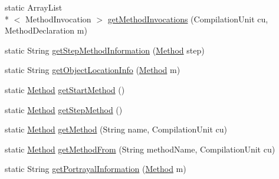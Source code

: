 \begin{DoxyCompactItemize}
\item 
static Array\-List\\*
$<$ Method\-Invocation $>$ \hyperlink{classit_1_1isislab_1_1masonassisteddocumentation_1_1mason_1_1analizer_1_1_global_utility_aa9d88a0fc6bb7d786e698dd76edc7cb9}{get\-Method\-Invocations} (Compilation\-Unit cu, Method\-Declaration m)
\item 
static String \hyperlink{classit_1_1isislab_1_1masonassisteddocumentation_1_1mason_1_1analizer_1_1_global_utility_a75a0fd94eb0074e165819c691cede69b}{get\-Step\-Method\-Information} (\hyperlink{classit_1_1isislab_1_1masonassisteddocumentation_1_1mason_1_1analizer_1_1_method}{Method} step)
\item 
static String \hyperlink{classit_1_1isislab_1_1masonassisteddocumentation_1_1mason_1_1analizer_1_1_global_utility_a0855e4ace0db17ec4967cddde0176919}{get\-Object\-Location\-Info} (\hyperlink{classit_1_1isislab_1_1masonassisteddocumentation_1_1mason_1_1analizer_1_1_method}{Method} m)
\item 
static \hyperlink{classit_1_1isislab_1_1masonassisteddocumentation_1_1mason_1_1analizer_1_1_method}{Method} \hyperlink{classit_1_1isislab_1_1masonassisteddocumentation_1_1mason_1_1analizer_1_1_global_utility_a5949741374c69ef4044811e71fe9584d}{get\-Start\-Method} ()
\item 
static \hyperlink{classit_1_1isislab_1_1masonassisteddocumentation_1_1mason_1_1analizer_1_1_method}{Method} \hyperlink{classit_1_1isislab_1_1masonassisteddocumentation_1_1mason_1_1analizer_1_1_global_utility_aa9fb303191107df569745cc2178d4281}{get\-Step\-Method} ()
\item 
static \hyperlink{classit_1_1isislab_1_1masonassisteddocumentation_1_1mason_1_1analizer_1_1_method}{Method} \hyperlink{classit_1_1isislab_1_1masonassisteddocumentation_1_1mason_1_1analizer_1_1_global_utility_afd0ff2a55bc28dd92665234871976820}{get\-Method} (String name, Compilation\-Unit cu)
\item 
static \hyperlink{classit_1_1isislab_1_1masonassisteddocumentation_1_1mason_1_1analizer_1_1_method}{Method} \hyperlink{classit_1_1isislab_1_1masonassisteddocumentation_1_1mason_1_1analizer_1_1_global_utility_ad79271b56ebb4e7d275af571b6b1659c}{get\-Method\-From} (String method\-Name, Compilation\-Unit cu)
\item 
static String \hyperlink{classit_1_1isislab_1_1masonassisteddocumentation_1_1mason_1_1analizer_1_1_global_utility_a65dae48d1cc6777b196ae80bdda17db7}{get\-Portrayal\-Information} (\hyperlink{classit_1_1isislab_1_1masonassisteddocumentation_1_1mason_1_1analizer_1_1_method}{Method} m)

\end{DoxyCompactItemize}
